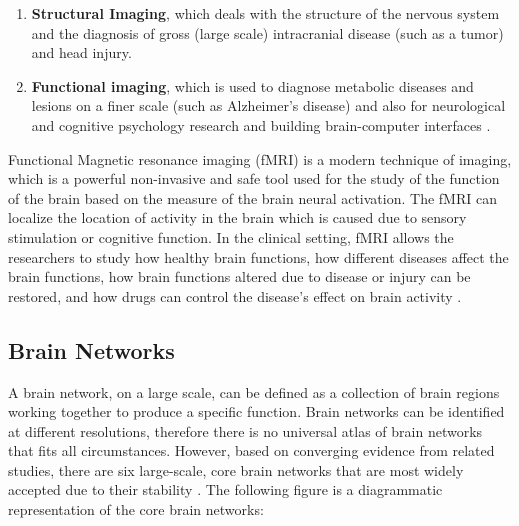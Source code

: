﻿\documentclass[12pt]{article}
\begin{document}
\begin{enumerate}

  \item \textbf{Structural Imaging}, which deals with the structure of
    the nervous system and the diagnosis of gross (large scale)
    intracranial disease (such as a tumor) and head injury.

  \item \textbf{Functional imaging}, which is used to diagnose
    metabolic diseases and lesions on a finer scale (such as
    Alzheimer’s disease) and also for neurological and cognitive
    psychology research and building brain-computer interfaces
    \cite{neuroimaging}.

\end{enumerate}

Functional Magnetic resonance imaging (fMRI) is a modern technique of
imaging, which is a powerful non-invasive and safe tool used for the
study of the function of the brain based on the measure of the brain
neural activation. The fMRI can localize the location of activity in
the brain which is caused due to sensory stimulation or cognitive
function. In the clinical setting, fMRI allows the researchers to
study how healthy brain functions, how different diseases affect the
brain functions, how brain functions altered due to disease or injury
can be restored, and how drugs can control the disease’s effect on
brain activity \cite{fMRI}.

\subsection{Brain Networks}

A brain network, on a large scale, can be defined as a collection of
brain regions working together to produce a specific function. Brain
networks can be identified at different resolutions, therefore there
is no universal atlas of brain networks that fits all
circumstances. However, based on converging evidence from related
studies, there are six large-scale, core brain networks that are most
widely accepted due to their stability
\cite{estimatingLargeScaleNetworks}. The following figure is
a diagrammatic representation of the core brain networks:
\end{document}
